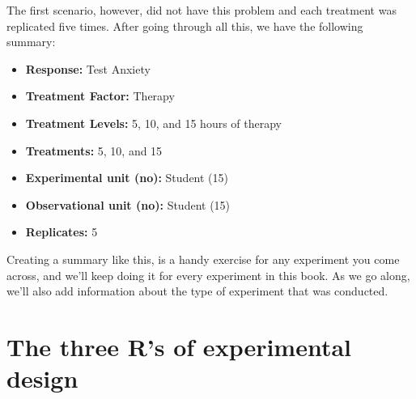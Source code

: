 \documentclass[
  letterpaper,
]{book}
\providecommand{\tightlist}{%
  \setlength{\itemsep}{0pt}\setlength{\parskip}{0pt}}\usepackage{longtable,booktabs,array}
\begin{document}
The first scenario, however, did not have this problem and each
treatment was replicated five times. After going through all this, we
have the following summary:

\begin{itemize}
\tightlist
\item
  \textbf{Response:} Test Anxiety\\
\item
  \textbf{Treatment Factor:} Therapy\\
\item
  \textbf{Treatment Levels:} 5, 10, and 15 hours of therapy\\
\item
  \textbf{Treatments:} 5, 10, and 15\\
\item
  \textbf{Experimental unit (no):} Student (15)\\
\item
  \textbf{Observational unit (no):} Student (15)\\
\item
  \textbf{Replicates:} 5
\end{itemize}

\begin{tcolorbox}[enhanced jigsaw, opacitybacktitle=0.6, colbacktitle=quarto-callout-tip-color!10!white, toprule=.15mm, bottomtitle=1mm, breakable, leftrule=.75mm, rightrule=.15mm, left=2mm, colback=white, coltitle=black, toptitle=1mm, colframe=quarto-callout-tip-color-frame, bottomrule=.15mm, title=\textcolor{quarto-callout-tip-color}{\faLightbulb}\hspace{0.5em}{Tip}, arc=.35mm, titlerule=0mm, opacityback=0]

Creating a summary like this, is a handy exercise for any experiment you
come across, and we'll keep doing it for every experiment in this book.
As we go along, we'll also add information about the type of experiment
that was conducted.

\end{tcolorbox}

\chapter*{The three R's of experimental
design}\label{the-three-rs-of-experimental-design}

\end{document}
